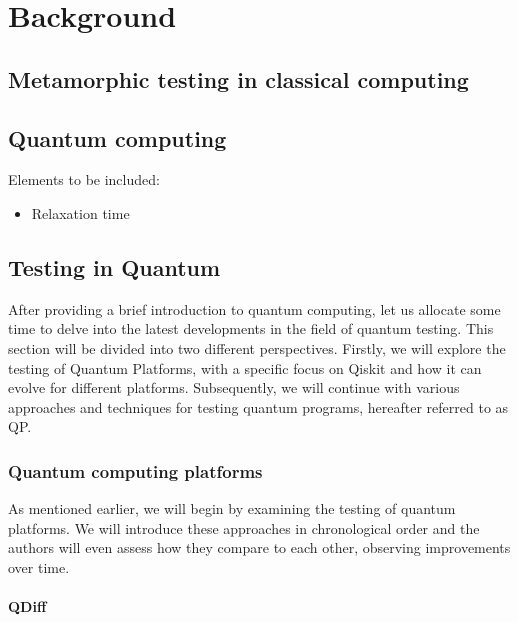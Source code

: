 \cleardoublepage

\chapter{Background}
\label{Ch2:Back}

\section{Metamorphic testing in classical computing}
\label{Ch2.1:Metamorphic}

\section{Quantum computing}
\label{Ch2.2:Quantum}
Elements to be included:
\begin{itemize}
    \item Relaxation time
\end{itemize}

\newpage

\section{Testing in Quantum}
\label{Ch2.3:TQuantum}

After providing a brief introduction to quantum computing, let us allocate some time to delve into the latest developments in the field of quantum testing. This section will be divided into two different perspectives. Firstly, we will explore the testing of Quantum Platforms, with a specific focus on Qiskit and how it can evolve for different platforms. Subsequently, we will continue with various approaches and techniques for testing quantum programs, hereafter referred to as QP.

\subsection{Quantum computing platforms}
\label{Ch2.3.1:TPlat}

As mentioned earlier, we will begin by examining the testing of quantum platforms. We will introduce these approaches in chronological order and the authors will even assess how they compare to each other, observing improvements over time.

\subsubsection{QDiff}
\label{Ch2.3.1:QDiff}

